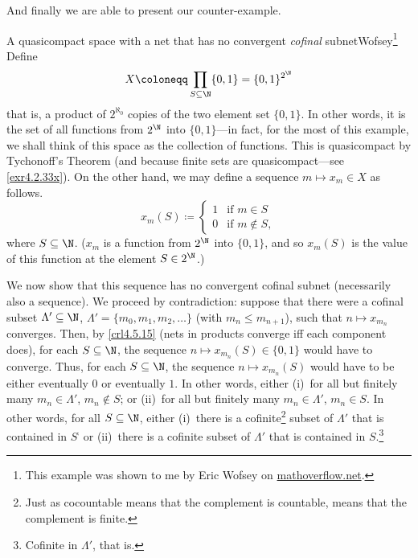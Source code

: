 And finally we are able to present our counter-example.
\begin{exm}{A quasicompact space with a net that has no convergent \emph{cofinal} subnet}{Wofsey}\footnote{This example was shown to me by Eric Wofsey on \href{http://mathoverflow.net/questions/210947/a-quasicompact-space-with-a-net-that-contains-no-convergent-strict-subnet}{mathoverflow.net}.}
Define
\begin{equation}
X\coloneqq \prod _{S\subseteq \N}\{ 0,1\} =\{ 0,1\} ^{2^{\N}}
\end{equation}
that is, a product of $2^{\aleph _0}$ copies of the two element set $\{ 0,1\}$.  In other words, it is the set of all functions from $2^{\N}$ into $\{ 0,1\}$---in fact, for the most of this example, we shall think of this space as the collection of functions.   This is quasicompact by Tychonoff's Theorem (and because finite sets are quasicompact---see \cref{exr4.2.33x}).  On the other hand, we may define a sequence $m\mapsto x_m\in X$ as follows.
\begin{equation}
x_m(S)\coloneqq \begin{cases}1 & \text{if }m\in S \\ 0 & \text{if }m\notin S,\end{cases}
\end{equation}
where $S\subseteq \N$.  ($x_m$ is a function from $2^{\N}$ into $\{ 0,1\}$, and so $x_m(S)$ is the value of this function at the element $S\in 2^{\N}$.)

We now show that this sequence has no convergent cofinal subnet (necessarily also a sequence).  We proceed by contradiction:  suppose that there were a cofinal subset $\Lambda '\subseteq \N$, $\Lambda '=\{ m_0,m_1,m_2,\ldots \}$ (with $m_n\leq m_{n+1}$), such that $n\mapsto x_{m_n}$ converges.  Then, by \cref{crl4.5.15} (nets in products converge iff each component does), for each $S\subseteq \N$, the sequence $n\mapsto x_{m_n}(S)\in \{ 0,1\}$ would have to converge.  Thus, for each $S\subseteq \N$, the sequence $n\mapsto x_{m_n}(S)$ would have to be either eventually $0$ or eventually $1$.  In other words, either (i)~for all but finitely many $m_n\in \Lambda '$, $m_n\notin S$;  or (ii)~for all but finitely many $m_n\in \Lambda '$, $m_n\in S$.  In other words, for all $S\subseteq \N$, either (i)~there is a cofinite\footnote{Just as cocountable means that the complement is countable,  means that the complement is finite.} subset of $\Lambda '$ that is contained in $S^{\comp}$ or (ii)~there is a cofinite subset of $\Lambda '$ that is contained in $S$.\footnote{Cofinite in $\Lambda '$, that is.}


\end{exm}
